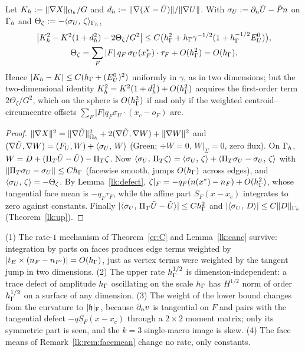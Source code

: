 \begin{corollary}\label{lk:K}
Let $K_h:=\lVert \nabla X\rVert_{\Omega_h}/G$ and $d_h:=\lVert \nabla(X-\tilde U)\rVert/\lVert \nabla U\rVert$. With $\sigma_U:=\partial_n\tilde U-\tilde P n$ on $\Gamma_h$ and $\Theta_\zeta:=-\langle \sigma_U,\, \zeta\rangle_{\Gamma_h}$,
\begin{gather*}
\bigl|K_h^2-K^2(1+d_h^2)-2\Theta_\zeta/G^2\bigr|\le C\bigl(h_\Gamma^2+h_\Gamma\gamma^{-1/2}(1+h_\Gamma^{-1/2}E^0_U)\bigr),\\
\Theta_\zeta=\sum_F|F|\,q_F\,\sigma_U(x_F^\ast)\cdot\tau_F+O(h_\Gamma^2)=O(h_\Gamma).
\end{gather*}
Hence $|K_h-K|\le C(h_\Gamma+(E^0_U)^2)$ uniformly in $\gamma$, as in two dimensions; but the two-dimensional identity $K_h^2=K^2(1+d_h^2)+O(h_\Gamma^2)$ acquires the first-order term $2\Theta_\zeta/G^2$, which on the sphere is $O(h_\Gamma^2)$ if and only if the weighted centroid--circumcentre offsets $\sum_F|F|q_F\sigma_U\cdot(x_c-o_F)$ are.
\end{corollary}
\begin{proof}
$\lVert \nabla X\rVert^2=\lVert \nabla\tilde U\rVert^2_{\Omega_h}+2(\nabla\tilde U,\nabla W)+\lVert \nabla W\rVert^2$ and $(\nabla\tilde U,\nabla W)=(F_U,W)+\langle \sigma_U,\, W\rangle$ (Green; $\div W=0$, $W|_\Sigma=0$, zero flux). On $\Gamma_h$, $W=D+(\Pi_T\tilde U-\tilde U)-\Pi_T\zeta$. Now $\langle \sigma_U,\, \Pi_T\zeta\rangle=\langle \sigma_U,\, \zeta\rangle+\langle \Pi_T\sigma_U-\sigma_U,\, \zeta\rangle$ with $\lVert \Pi_T\sigma_U-\sigma_U\rVert\le Ch_\Gamma$ (facewise smooth, jumps $O(h_\Gamma)$ across edges), and $\langle \sigma_U,\, \zeta\rangle=-\Theta_\zeta$. By Lemma~\ref{lk:defect}, $\zeta|_F=-q_F(n(x^\ast)-n_F)+O(h_\Gamma^2)$, whose tangential face mean is $-q_F\tau_F$, while the affine part $S_F(x-x_c)$ integrates to zero against constants. Finally $|\langle \sigma_U,\, \Pi_T\tilde U-\tilde U\rangle|\le Ch_\Gamma^2$ and $|\langle \sigma_U,\, D\rangle|\le C\lVert D\rVert_{\Gamma_h}$ (Theorem~\ref{lk:up}).
\end{proof}

\begin{remark}[What $\dn v\cdot n_F=-\div_Fv_F$ changes]\label{lk:rem:diff}
(1) The rate-$1$ mechanism of Theorem~\ref{er:C} and Lemma~\ref{lk:canc} survive: integration by parts on faces produces edge terms weighted by $|t_E\times(n_F-n_{F'})|=O(h_\Gamma)$, just as vertex terms were weighted by the tangent jump in two dimensions. (2) The upper rate $h_\Gamma^{1/2}$ is dimension-independent: a trace defect of amplitude $h_\Gamma$ oscillating on the scale $h_\Gamma$ has $H^{1/2}$ norm of order $h_\Gamma^{1/2}$ on a surface of any dimension. (3) The weight of the lower bound changes from the curvature to $|\mathfrak h|_{\rm F}$, because $\partial_n v$ is tangential on $F$ and pairs with the tangential defect $-qS_F(x-x_c)$ through a $2\times2$ moment matrix; only its symmetric part is seen, and the $k=3$ single-macro image is skew. (4) The face means of Remark~\ref{lk:rem:facemean} change no rate, only constants.
\end{remark}

